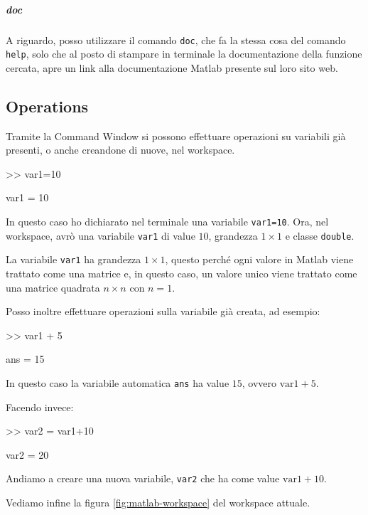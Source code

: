 %
\subparagraph{doc} A riguardo, posso utilizzare il comando \verb|doc|, che fa la stessa cosa del comando \verb|help|, solo che al posto di stampare in terminale la documentazione della funzione cercata, apre un link alla documentazione Matlab presente sul loro sito web.

%
\subsection{Operations}
Tramite la Command Window si possono effettuare operazioni su variabili già presenti, o anche creandone di nuove, nel workspace.
\begin{example}\end{example}
\begin{matlab}
    >> var1=10

    var1 =
    10
\end{matlab}

In questo caso ho dichiarato nel terminale una variabile \verb|var1=10|. Ora, nel workspace, avrò una variabile \verb|var1| di value $ 10 $, grandezza $ 1 \times 1 $ e classe \verb|double|.
\begin{note}
    La variabile \verb|var1| ha grandezza $ 1 \times 1 $, questo perché ogni valore in Matlab viene trattato come una matrice e, in questo caso, un valore unico viene trattato come una matrice quadrata $ n \times n $ con $ n=1 $.
\end{note}

Posso inoltre effettuare operazioni sulla variabile già creata, ad esempio:
\begin{example}\end{example}
\begin{matlab}
    >> var1 + 5

    ans =
    15
\end{matlab}

In questo caso la variabile automatica \verb|ans| ha value $ 15 $, ovvero $ \text{var1}+5 $.

\begin{example}
    Facendo invece:
    \begin{matlab}
        >> var2 = var1+10

        var2 =
        20
    \end{matlab}
    Andiamo a creare una nuova variabile, \verb|var2| che ha come value $ \text{var1}+10 $.
\end{example}
Vediamo infine la figura \ref{fig:matlab-workspace} del workspace attuale.

